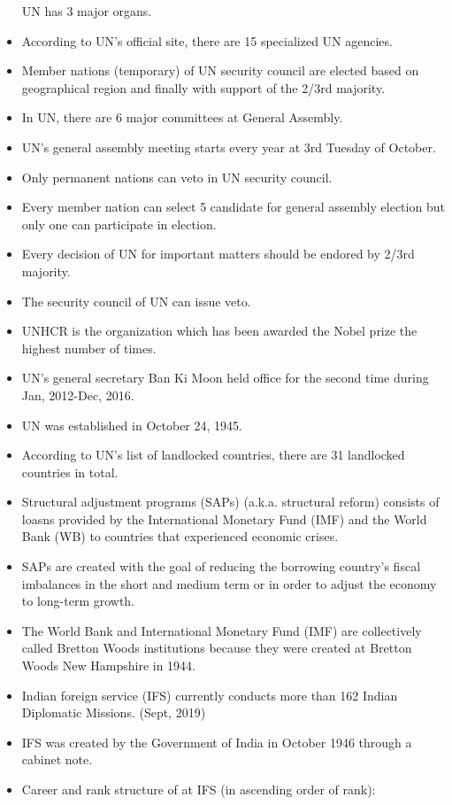 \documentclass[
  openany]{book}
\begin{document}
\begin{itemize}
  UN has 3 major organs.
\item
  According to UN's official site, there are 15 specialized UN agencies.
\item
  Member nations (temporary) of UN security council are elected based on geographical region and finally with support of the 2/3rd majority.
\item
  In UN, there are 6 major committees at General Assembly.
\item
  UN's general assembly meeting starts every year at 3rd Tuesday of October.
\item
  Only permanent nations can veto in UN security council.
\item
  Every member nation can select 5 candidate for general assembly election but only one can participate in election.
\item
  Every decision of UN for important matters should be endored by 2/3rd majority.
\item
  The security council of UN can issue veto.
\item
  UNHCR is the organization which has been awarded the Nobel prize the highest number of times.
\item
  UN's general secretary Ban Ki Moon held office for the second time during Jan, 2012-Dec, 2016.
\item
  UN was established in October 24, 1945.
\item
  According to UN's list of landlocked countries, there are 31 landlocked countries in total.
\item
  Structural adjustment programs (SAPs) (a.k.a. structural reform) consists of loasns provided by the International Monetary Fund (IMF) and the World Bank (WB) to countries that experienced economic crises.
\item
  SAPs are created with the goal of reducing the borrowing country's fiscal imbalances in the short and medium term or in order to adjust the economy to long-term growth.
\item
  The World Bank and International Monetary Fund (IMF) are collectively called Bretton Woods institutions because they were created at Bretton Woods New Hampshire in 1944.
\item
  Indian foreign service (IFS) currently conducts more than 162 Indian Diplomatic Missions. (Sept, 2019)
\item
  IFS was created by the Government of India in October 1946 through a cabinet note.
\item
  Career and rank structure of at IFS (in ascending order of rank):


\end{itemize}
\end{document}
